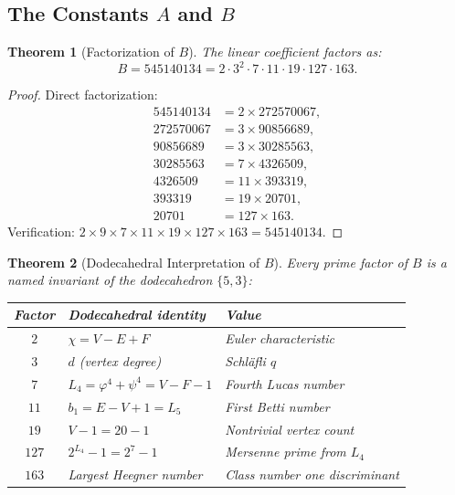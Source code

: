 \documentclass[11pt,a4paper]{article}
\theoremstyle{plain}
\newtheorem{theorem}{Theorem}[section]
\theoremstyle{definition}
\begin{document}
\subsection{The Constants $A$ and $B$}

\begin{theorem}[Factorization of $B$]\label{thm:B-factor}
The linear coefficient factors as:
\begin{equation}\label{eq:B-factor}
  B = 545140134 = 2 \cdot 3^2 \cdot 7 \cdot 11 \cdot 19 \cdot 127
      \cdot 163.
\end{equation}
\end{theorem}

\begin{proof}
Direct factorization:
\begin{align*}
  545140134 &= 2 \times 272570067, \\
  272570067 &= 3 \times 90856689, \\
  90856689 &= 3 \times 30285563, \\
  30285563 &= 7 \times 4326509, \\
  4326509 &= 11 \times 393319, \\
  393319 &= 19 \times 20701, \\
  20701 &= 127 \times 163.
\end{align*}
Verification: $2 \times 9 \times 7 \times 11 \times 19 \times 127 \times
163 = 545140134$. \checkmark
\end{proof}

\begin{theorem}[Dodecahedral Interpretation of $B$]\label{thm:B-dodec}
Every prime factor of $B$ is a named invariant of the dodecahedron $\{5, 3\}$:
\begin{center}
\begin{tabular}{@{}cll@{}}
\toprule
Factor & Dodecahedral identity & Value \\
\midrule
$2$ & $\chi = V - E + F$ & Euler characteristic \\
$3$ & $d$ (vertex degree) & Schl\"afli $q$ \\
$7$ & $L_4 = \varphi^4 + \psi^4 = V - F - 1$ & Fourth Lucas number \\
$11$ & $b_1 = E - V + 1 = L_5$ & First Betti number \\
$19$ & $V - 1 = 20 - 1$ & Nontrivial vertex count \\
$127$ & $2^{L_4} - 1 = 2^7 - 1$ & Mersenne prime from $L_4$ \\
$163$ & Largest Heegner number & Class number one discriminant \\
\bottomrule
\end{tabular}
\end{center}
\end{theorem}
\end{document}
